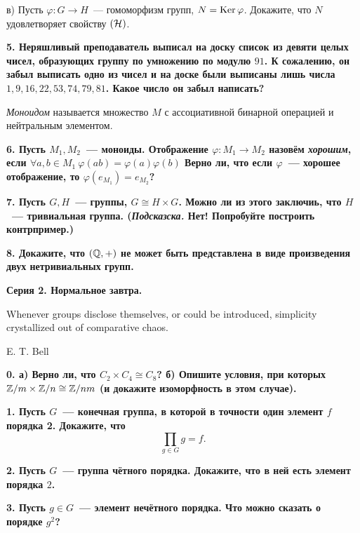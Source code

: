 \documentclass[10pt]{article}
\begin{document}
\begin{landscape}
\begin{multicols}{2}
	в) Пусть $\varphi \colon G \to H$~--- гомоморфизм групп, $N = \operatorname{Ker}{\varphi}$. Докажите, что $N$ удовлетворяет свойству $(\mathcal{H})$.

	\bf{5.} Неряшливый преподаватель выписал на доску список из девяти целых чисел, образующих группу по умножению по модулю $91$. К сожалению, он забыл выписать одно из чисел и на доске были выписаны лишь числа $1, 9, 16, 22, 53, 74, 79, 81$. Какое число он забыл написать? 

	\begin{definition} 
		\emph{Моноидом} называется множество $M$ с ассоциативной бинарной операцией и нейтральным элементом.   
	\end{definition}

	\bf{6.} Пусть $M_1, M_2$~--- моноиды. Отображение $\varphi \colon M_1 \to M_2$ назовём \emph{хорошим}, если $\forall a, b \in M_1 \ \varphi(ab) = \varphi(a) \varphi(b)$
	  Верно ли, что если $\varphi$~--- хорошее отображение, то $\varphi(e_{M_1}) = e_{M_2}$?

	 \bf{7.}  Пусть $G, H$~--- группы,  $G \cong H \times G$. Можно ли из этого заключиь, что $H$~--- тривиальная группа. (\emph{Подсказска.} Нет! Попробуйте построить контрпример.)

	 \bf{8.} Докажите, что $(\mathbb{Q}, +)$ не может быть представлена в виде произведения двух нетривиальных групп. 


	\columnbreak

	
	\centerline{\bf{Серия 2. Нормальное завтра. }}

	\epigraph{Whenever groups disclose themselves, or could be introduced, simplicity crystallized out of comparative chaos.}{E. T. Bell}


	\bf{0.} а) Верно ли, что $C_{2} \times C_{4} \cong C_{8}$? б) Опишите условия, при которых  $\mathbb{Z}/m \times \mathbb{Z}/n \cong \mathbb{Z}/nm$ (и докажите изоморфность в этом случае). 


	\bf{1.} Пусть $G$~--- конечная группа, в которой в точности один элемент $f$ порядка 2. Докажите, что 
	\[
		\prod_{g \in G} g = f.
	\]

	\bf{2.} Пусть $G$~--- группа чётного порядка. Докажите, что в ней есть элемент порядка $2$. 

	\bf{3.} Пусть $g \in G$~--- элемент нечётного порядка. Что можно сказать о порядке $g^2$?


\end{multicols}
\end{landscape}
\end{document}
